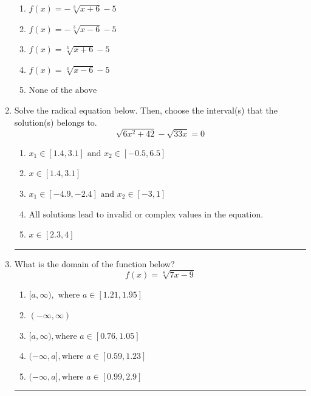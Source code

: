 \documentclass[14pt]{extbook}
\newcommand{\litem}[1]{\item#1\hspace*{-1cm}\rule{\textwidth}{0.4pt}}
\begin{document}
\begin{enumerate}
{\begin{center}
\end{center}
\begin{enumerate}[label=\Alph*.]
\item \( f(x) = - \sqrt[3]{x + 6} - 5 \)
\item \( f(x) = - \sqrt[3]{x - 6} - 5 \)
\item \( f(x) = \sqrt[3]{x + 6} - 5 \)
\item \( f(x) = \sqrt[3]{x - 6} - 5 \)
\item \( \text{None of the above} \)

\end{enumerate} }
\litem{
Solve the radical equation below. Then, choose the interval(s) that the solution(s) belongs to.\[ \sqrt{6 x^2 + 42} - \sqrt{33 x} = 0 \]\begin{enumerate}[label=\Alph*.]
\item \( x_1 \in [1.4, 3.1] \text{ and } x_2 \in [-0.5,6.5] \)
\item \( x \in [1.4,3.1] \)
\item \( x_1 \in [-4.9, -2.4] \text{ and } x_2 \in [-3,1] \)
\item \( \text{All solutions lead to invalid or complex values in the equation.} \)
\item \( x \in [2.3,4] \)

\end{enumerate} }
\litem{
What is the domain of the function below?\[ f(x) = \sqrt[8]{7 x - 9} \]\begin{enumerate}[label=\Alph*.]
\item \( [a, \infty), \text{ where } a \in [1.21, 1.95] \)
\item \( (-\infty, \infty) \)
\item \( [a, \infty), \text{where } a \in [0.76, 1.05] \)
\item \( (-\infty, a], \text{where } a \in [0.59, 1.23] \)
\item \( (-\infty, a], \text{where } a \in [0.99, 2.9] \)


\end{enumerate}}
\end{enumerate}
\end{document}
